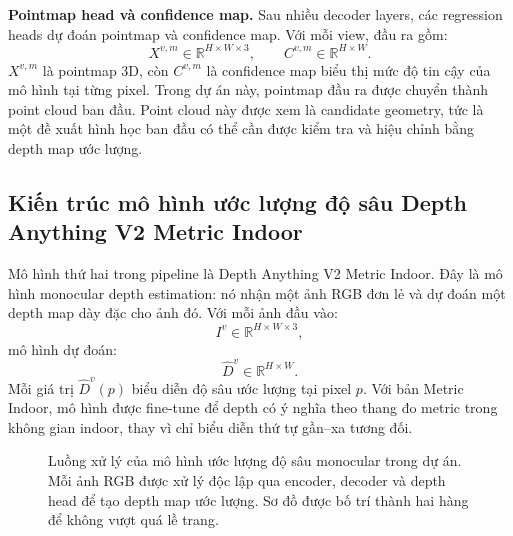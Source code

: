 \documentclass[12pt,a4paper]{article}
\newcommand{\da}{Depth Anything V2}
\begin{document}
\textbf{Pointmap head và confidence map.} Sau nhiều decoder layers, các regression heads dự đoán pointmap và confidence map. Với mỗi view, đầu ra gồm:
\begin{equation}
X^{v,m}\in \mathbb{R}^{H\times W\times 3}, \qquad C^{v,m}\in \mathbb{R}^{H\times W}.
\end{equation}
$X^{v,m}$ là pointmap 3D, còn $C^{v,m}$ là confidence map biểu thị mức độ tin cậy của mô hình tại từng pixel. Trong dự án này, pointmap đầu ra được chuyển thành point cloud ban đầu. Point cloud này được xem là candidate geometry, tức là một đề xuất hình học ban đầu có thể cần được kiểm tra và hiệu chỉnh bằng depth map ước lượng.

\subsection{Kiến trúc mô hình ước lượng độ sâu Depth Anything V2 Metric Indoor}
Mô hình thứ hai trong pipeline là \da{} Metric Indoor. Đây là mô hình monocular depth estimation: nó nhận một ảnh RGB đơn lẻ và dự đoán một depth map dày đặc cho ảnh đó. Với mỗi ảnh đầu vào:
\begin{equation}
I^v \in \mathbb{R}^{H\times W\times 3},
\end{equation}
mô hình dự đoán:
\begin{equation}
\hat{D}^{v}\in \mathbb{R}^{H\times W}.
\end{equation}
Mỗi giá trị $\hat{D}^{v}(p)$ biểu diễn độ sâu ước lượng tại pixel $p$. Với bản Metric Indoor, mô hình được fine-tune để depth có ý nghĩa theo thang đo metric trong không gian indoor, thay vì chỉ biểu diễn thứ tự gần--xa tương đối.


\begin{figure}[H]
\centering
{}
\caption{Luồng xử lý của mô hình ước lượng độ sâu monocular trong dự án. Mỗi ảnh RGB được xử lý độc lập qua encoder, decoder và depth head để tạo depth map ước lượng. Sơ đồ được bố trí thành hai hàng để không vượt quá lề trang.}
\label{fig:depth_estimator}
\end{figure}
\end{document}
